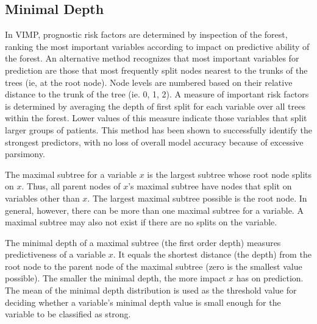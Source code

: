 \documentclass[nojss]{jss}\usepackage[]{graphicx}\usepackage[]{color}
\begin{document}
\subsection{Minimal Depth}\label{S:minimalDepth}
In VIMP, prognostic risk factors are determined by inspection of the forest, ranking the most important variables according to impact on predictive ability of the forest. An alternative method recognizes that most important variables for prediction are those that most frequently split nodes nearest to the trunks of the trees (ie, at the root node). Node levels are numbered based on their relative distance to the trunk of the tree (ie. 0, 1, 2).  A measure of important risk factors is determined by averaging the depth of first split for each variable over all trees within the forest. Lower values of this measure indicate those variables that split larger groups of patients. This method has been shown to successfully identify the strongest predictors, with no loss of overall model accuracy because of excessive parsimony.

The maximal subtree for a variable $x$ is the largest subtree whose root node splits on $x$. Thus, all parent nodes of $x$'s maximal subtree have nodes that split on variables other than $x$. The largest maximal subtree possible is the root node. In general, however, there can be more than one maximal subtree for a variable. A maximal subtree may also not exist if there are no splits on the variable.

The minimal depth of a maximal subtree (the first order depth) measures predictiveness of a variable $x$. It equals the shortest distance (the depth) from the root node to the parent node of the maximal subtree (zero is the smallest value possible). The smaller the minimal depth, the more impact $x$ has on prediction. The mean of the minimal depth distribution is used as the threshold value for deciding whether a variable's minimal depth value is small enough for the variable to be classified as strong. 

% 
\end{document}
